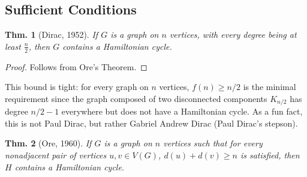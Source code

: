 \documentclass[12pt, a4paper]{book}
\newtheorem{theorem}{Thm.}[section]
\theoremstyle{nonumberplain}
\newtheorem{proof}{Proof}
\begin{document}
\subsection{Sufficient Conditions}
\begin{theorem}[Dirac, 1952]
    If $G$ is a graph on $n$ vertices, with every degree being at least $\frac{n}{2}$, then $G$ contains a Hamiltonian cycle.
\end{theorem}
\begin{proof}
    Follows from Ore's Theorem.
\end{proof}
This bound is tight: for every graph on $n$ vertices, $f(n)\geq n/2$ is the minimal requirement since the graph composed of two disconnected components $K_{n/2}$ has degree $n/2-1$ everywhere but does not have a Hamiltonian cycle.
As a fun fact, this is not Paul Dirac, but rather Gabriel Andrew Dirac (Paul Dirac's stepson).
\begin{theorem}[Ore, 1960]
    If $G$ is a graph on $n$ vertices such that for every nonadjacent pair of vertices $u,v\in V(G)$, $d(u)+d(v)\geq n$ is satisfied, then $H$ contains a Hamiltonian cycle.
\end{theorem}
\end{document}
